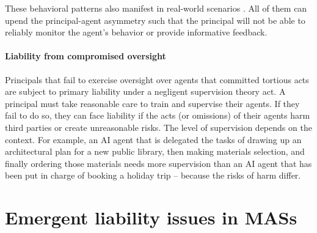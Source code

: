 \documentclass[11pt]{article}
\begin{document}
These behavioral patterns also manifest in real-world scenarios \citep{blonz_costs_2023}. All of them can upend the principal-agent asymmetry such that the principal will not be able to reliably monitor the agent's behavior or provide informative feedback.

\paragraph{Liability from compromised oversight} Principals that fail to exercise oversight over agents that committed tortious acts are subject to primary liability under a negligent supervision theory \citep{cavico2016tort} act.  A principal must take reasonable care to train and supervise their agents.  If they fail to do so, they can face liability if the acts (or omissions) of their agents harm third parties or create unreasonable risks. The level of supervision depends on the context.  For example, an AI agent that is delegated the tasks of drawing up an architectural plan for a new public library, then making materials selection, and finally ordering those materials needs more supervision than an AI agent that has been put in charge of booking a holiday trip -- because the risks of harm differ.
\vspace{-0.3em}


\section{Emergent liability issues in MASs}
\end{document}
